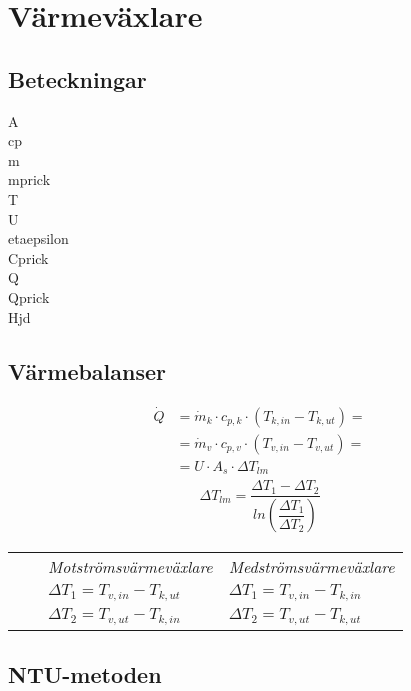 \chapter{Värmeväxlare}
\section*{Beteckningar}

\acrfull{A} \\
\acrfull{cp} \\
\acrfull{m} \\
\acrfull{mprick} \\
\acrfull{T} \\
\acrfull{U} \\
\acrfull{etaepsilon} \\
\acrfull{Cprick} \\
\acrfull{Q} \\
\acrfull{Qprick} \\
\acrfull{Hjd}

\section*{Värmebalanser}
	\begin{align*}
		\dot{Q}&=\dot{m}_k\cdot c_{p,k}\cdot (T_{k,in}-T_{k,ut}) = \\
		       &=\dot{m}_v\cdot c_{p,v}\cdot (T_{v,in}-T_{v,ut}) = \\
		       &=U \cdot A_s \cdot \Delta T_{lm} 
	\end{align*}
	\begin{align*}
	\Delta T_{lm} = \dfrac{\Delta T_1 - \Delta T_2}{ln \left( \dfrac{\Delta T_1}{\Delta T_2}\right)}
	\end{align*}
	\begin{tabular}{l l l l}
    &&\textit{Motströmsvärmeväxlare} & \textit{Medströmsvärmeväxlare} \\
    &&$\Delta T_1 = T_{v,in} - T_{k,ut}$ & $\Delta T_1 = T_{v,in} - T_{k,in}$ \\
    &&$\Delta T_2 = T_{v,ut} - T_{k,in}$ & $\Delta T_2 = T_{v,ut} - T_{k,ut}$ \\
	\end{tabular}
	\section*{NTU-metoden}

